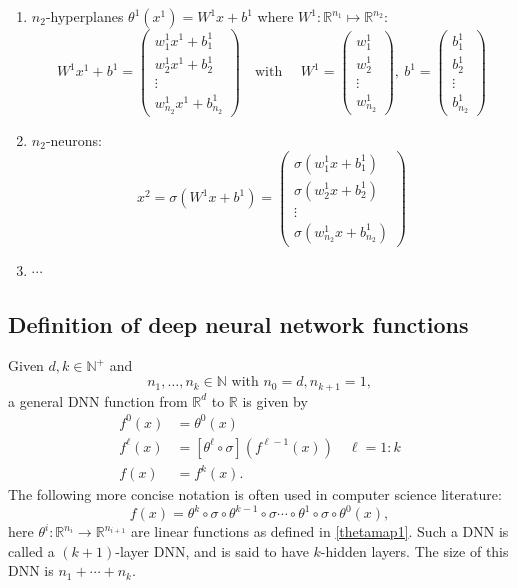 \begin{enumerate}
	\item $n_2$-hyperplanes $\theta^{1}(x^1) = W^1 x + b^1$ where $W^1: \mathbb{R}^{n_1} \mapsto \mathbb{R}^{n_2}$:
	$$
	W^1x^1+b^1=
	\begin{pmatrix}
	w^1_1x^1+b^1_1\\
	w^1_2x^1+b^1_2\\
	\vdots \\  
	w^1_{n_2}x^1+b^1_{n_2}
	\end{pmatrix}\quad \mbox{with }\quad 
	W^1=
	\begin{pmatrix}
	w^1_1 \\
	w^1_2 \\
	\vdots \\  
	w^1_{n_2} 
	\end{pmatrix},\ 
	b^1=
	\begin{pmatrix}
	b^1_1\\
	b^1_2\\
	\vdots \\  
	b^1_{n_2}
	\end{pmatrix}
	$$
	\item $n_2$-neurons:
	$$
	x^2=\sigma(W^1x+b^1)
	=\begin{pmatrix}
	\sigma(w^1_1x+b^1_1)\\
	\sigma(w^1_2x+b^1_2)\\
	\vdots \\  
	\sigma(w^1_{n_2}x+b^1_{n_2})
	\end{pmatrix}
	$$
	\item $\cdots$
\end{enumerate} 

\subsection{Definition of deep neural network functions}\label{sec:DNN}
Given $d, k\in\mathbb{N}^+$ and  
$$
n_1,\dots,n_{k}\in\mathbb{N} \mbox{ with }n_0=d, n_{k+1}=1, 
$$
a general DNN function from $\mathbb{R}^d$ to $\mathbb{R}$ is given by
\begin{align*}
f^0(x)   &=\theta^0(x) \\ 
f^{\ell}(x) &= [  \theta^{\ell} \circ \sigma ](f^{\ell-1}(x)) \quad \ell = 1:k \\
f(x) &= f^k(x). 
\end{align*}
The following more concise notation is often used in computer science literature:
\begin{equation}
\label{compress-dnn}
f(x) = \theta^{k}\circ \sigma \circ \theta^{k-1} \circ \sigma \cdots \circ \theta^1 \circ \sigma \circ \theta^0(x),
\end{equation}
here $\theta^i: \mathbb{R}^{n_{i}}\to\mathbb{R}^{n_{i+1}}$ are linear
functions as defined in \eqref{thetamap1}.  Such a DNN is called a
$(k+1)$-layer DNN, and is said to have $k$-hidden layers. The size of
this DNN is $n_1+\cdots+n_k$.

